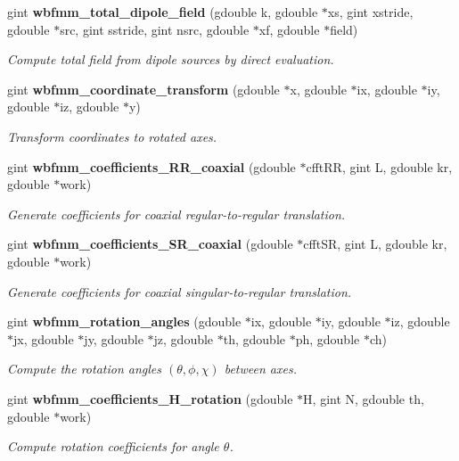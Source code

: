 \begin{DoxyCompactItemize}
gint {\bf wbfmm\+\_\+total\+\_\+dipole\+\_\+field} (gdouble k, gdouble $\ast$xs, gint xstride, gdouble $\ast$src, gint sstride, gint nsrc, gdouble $\ast$xf, gdouble $\ast$field)
\begin{DoxyCompactList}\small\item\em Compute total field from dipole sources by direct evaluation. \end{DoxyCompactList}\item 
gint {\bf wbfmm\+\_\+coordinate\+\_\+transform} (gdouble $\ast$x, gdouble $\ast$ix, gdouble $\ast$iy, gdouble $\ast$iz, gdouble $\ast$y)
\begin{DoxyCompactList}\small\item\em Transform coordinates to rotated axes. \end{DoxyCompactList}\item 
gint {\bf wbfmm\+\_\+coefficients\+\_\+\+R\+R\+\_\+coaxial} (gdouble $\ast$cfft\+R\+R, gint L, gdouble kr, gdouble $\ast$work)
\begin{DoxyCompactList}\small\item\em Generate coefficients for coaxial regular-\/to-\/regular translation. \end{DoxyCompactList}\item 
gint {\bf wbfmm\+\_\+coefficients\+\_\+\+S\+R\+\_\+coaxial} (gdouble $\ast$cfft\+S\+R, gint L, gdouble kr, gdouble $\ast$work)
\begin{DoxyCompactList}\small\item\em Generate coefficients for coaxial singular-\/to-\/regular translation. \end{DoxyCompactList}\item 
gint {\bf wbfmm\+\_\+rotation\+\_\+angles} (gdouble $\ast$ix, gdouble $\ast$iy, gdouble $\ast$iz, gdouble $\ast$jx, gdouble $\ast$jy, gdouble $\ast$jz, gdouble $\ast$th, gdouble $\ast$ph, gdouble $\ast$ch)
\begin{DoxyCompactList}\small\item\em Compute the rotation angles $(\theta,\phi,\chi)$ between axes. \end{DoxyCompactList}\item 
gint {\bf wbfmm\+\_\+coefficients\+\_\+\+H\+\_\+rotation} (gdouble $\ast$H, gint N, gdouble th, gdouble $\ast$work)
\begin{DoxyCompactList}\small\item\em Compute rotation coefficients for angle $\theta$. \end{DoxyCompactList}\item 

\end{DoxyCompactItemize}
